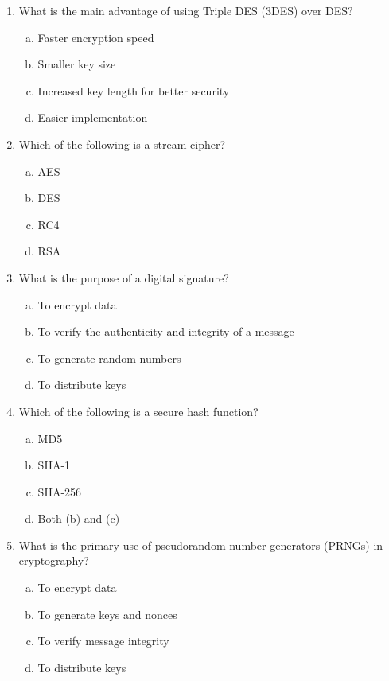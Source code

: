 \documentclass[12pt]{article}
\begin{document}
\begin{enumerate}
    \item What is the main advantage of using Triple DES (3DES) over DES?
    \begin{enumerate}[(a)]
        \item Faster encryption speed
        \item Smaller key size
        \item Increased key length for better security
        \item Easier implementation
    \end{enumerate}
\newpage
    \item Which of the following is a stream cipher?
    \begin{enumerate}[(a)]
        \item AES
        \item DES
        \item RC4
        \item RSA
    \end{enumerate}

    \item What is the purpose of a digital signature?
    \begin{enumerate}[(a)]
        \item To encrypt data
        \item To verify the authenticity and integrity of a message
        \item To generate random numbers
        \item To distribute keys
    \end{enumerate}

    \item Which of the following is a secure hash function?
    \begin{enumerate}[(a)]
        \item MD5
        \item SHA-1
        \item SHA-256
        \item Both (b) and (c)
    \end{enumerate}

    \item What is the primary use of pseudorandom number generators (PRNGs) in cryptography?
    \begin{enumerate}[(a)]
        \item To encrypt data
        \item To generate keys and nonces
        \item To verify message integrity
        \item To distribute keys
    \end{enumerate}
\end{enumerate}
\end{document}
